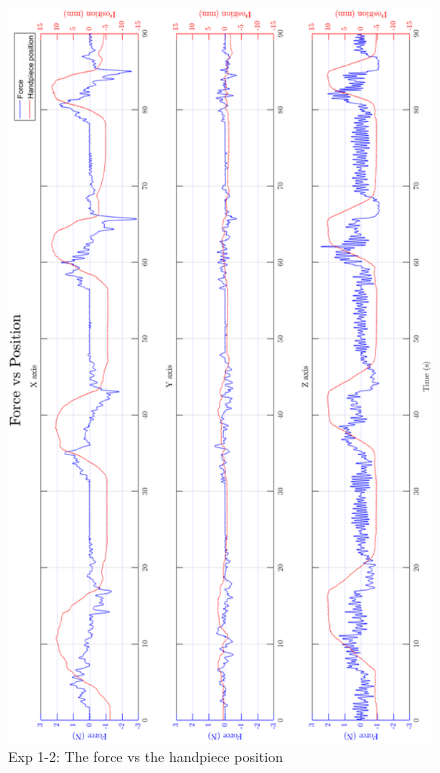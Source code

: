 \begin{figure}[htbp]
\begin{center}
\includegraphics[width=0.9\linewidth]{Images/exp/exp1_2_3.png}
\caption{Exp 1-2: The force vs the handpiece position}
\label{fig: exp1_2_3}
\end{center}
\end{figure}

